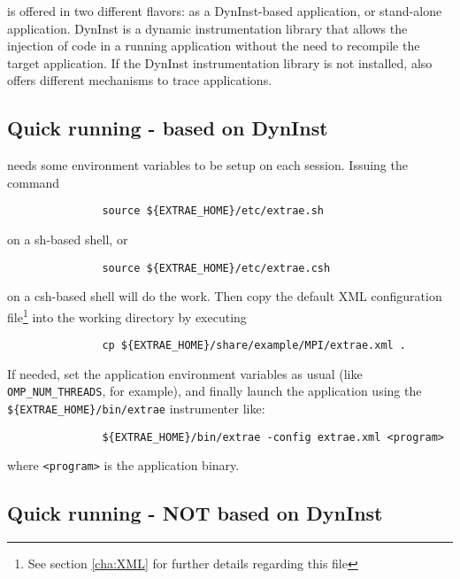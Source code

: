 \TRACE is offered in two different flavors: as a DynInst-based application, or stand-alone application. DynInst is a dynamic instrumentation library that allows the injection of code in a running application without the need to recompile the target application. If the DynInst instrumentation library is not installed, \TRACE also offers different mechanisms to trace applications.

\subsection{Quick running \TRACE - based on DynInst}\label{subsec:RunningTraceDynInst}

\TRACE needs some environment variables to be setup on each session. Issuing the command 

\begin{verbatim}
               source ${EXTRAE_HOME}/etc/extrae.sh
\end{verbatim}

on a sh-based shell, or 

\begin{verbatim}
               source ${EXTRAE_HOME}/etc/extrae.csh
\end{verbatim}

on a csh-based shell will do the work. Then copy the default XML configuration file\footnote{See section \ref{cha:XML} for further details regarding this file} into the working directory by executing

\begin{verbatim}
               cp ${EXTRAE_HOME}/share/example/MPI/extrae.xml .
\end{verbatim}

If needed, set the application environment variables as usual (like {\tt OMP\_NUM\_THREADS}, for example), and finally launch the application using the {\tt \$\{EXTRAE\_HOME\}/bin/extrae} instrumenter like:

\begin{verbatim}
               ${EXTRAE_HOME}/bin/extrae -config extrae.xml <program>
\end{verbatim}

where {\tt <program>} is the application binary.

\subsection{Quick running \TRACE - NOT based on DynInst}\label{subsec:RunningTraceNOTDynInst}

